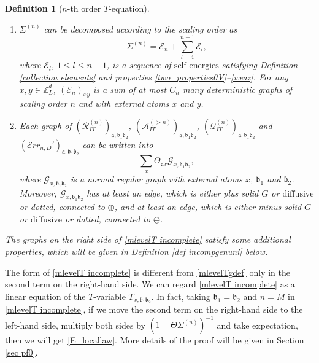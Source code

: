 \documentclass{article}
\newcommand{\1}{\mathds{1}}
\numberwithin{equation}{section}
\newcommand{\be}{\begin{equation}}
\newcommand{\ee}{\end{equation}}
\newcommand{\fa}{{\mathfrak a}}
\newcommand{\fb}{{\mathfrak b}}
\renewcommand{\cal}{\mathcal}
\renewcommand{\leq}{\leqslant}
\renewcommand{\le}{\leq}
\newcommand{\Z}{\mathbb{Z}}
\newcommand{\dashed}{\text{diffusive}}
\newcommand{\selfs}{\text{self-energies}}
\theoremstyle{plain} %
\newtheorem{definition}[theorem]{Definition}
\theoremstyle{remark}
\newtheorem{remark}[theorem]{Remark}
\newcommand{\wtSdeltan}{\Sigma^{(n)}}
\newcommand{\Sele}{{\mathcal E}}
\newcommand{\incomp}{{\text{$T$-equation}}}
\newcommand{\PITn}{{\mathcal R_{IT}^{(n)}}}
\newcommand{\QITn}{{\mathcal Q_{IT}^{(n)}}}
\newcommand{\AITn}{{\mathcal A_{IT}^{(>n)}}}
\newcommand{\Err}{{\mathcal Err}}
\begin{document}
\begin{definition} [$n$-th order $\incomp$]
\begin{enumerate}
		\item $\wtSdeltan$ %
		can be decomposed according to the scaling order as 
		\be\label{decompose Sdelta} 
		\wtSdeltan = \Sele_n + \sum_{l=4}^{n-1} \Sele_{l},
		\ee
		where $\Sele_{l}$, $1\le l \le n-1$, is a sequence of $\selfs$ satisfying Definition \ref{collection elements} and properties \eqref{two_properties0V}--\eqref{weaz}. For any $x,y \in \Z_L^d$, $(\Sele_{n})_{xy}$ is a sum of at most $C_n$ many deterministic graphs of scaling order $n$ and with external atoms $x$ and $y$. 
		
		\item Each graph of $(\PITn)_{\fa,\fb_1\fb_2}$, $(\AITn)_{\fa,\fb_1\fb_2}$, $(\QITn)_{\fa,\fb_1\fb_2} $ and $(\Err_{n,D}')_{\fa,\fb_1\fb_2}$ can be written into %
		$$ \sum_{x}\Theta_{\fa x} {\cal G}_{x,\fb_1\fb_2},$$ 
		where $ {\cal G}_{x,\fb_1\fb_2}$ is a normal regular graph with external atoms $x$, $\fb_1$ and $\fb_2$. Moreover, $ {\cal G}_{x,\fb_1\fb_2}$ has at least an edge, which is either plus solid $G$ or $\dashed$ or dotted,  connected to  $\oplus$, and at least an edge, which is either minus solid $G$ or $\dashed$ or dotted, connected to $\ominus$.
		
	
	\end{enumerate}
	The graphs on the right side of \eqref{mlevelT incomplete} satisfy some additional properties, which will be given in Definition \ref{def incompgenuni} below.
\end{definition} 
The form of \eqref{mlevelT incomplete} is different from \eqref{mlevelTgdef} only in the second term on the right-hand side. We can regard \eqref{mlevelT incomplete} as a linear equation of the $T$-variable $T_{x,\fb_1\fb_2}$. %
In fact, taking $\fb_1=\fb_2$ and $n=M$ in \eqref{mlevelT incomplete}, if we move the second term on the right-hand side to the left-hand side, multiply both sides by $(1-\Theta\wtSdeltan)^{-1}$ and take expectation, then we will get \eqref{E_locallaw}. More details of the proof %
will be given in Section \ref{sec pf0}.
\end{document}
